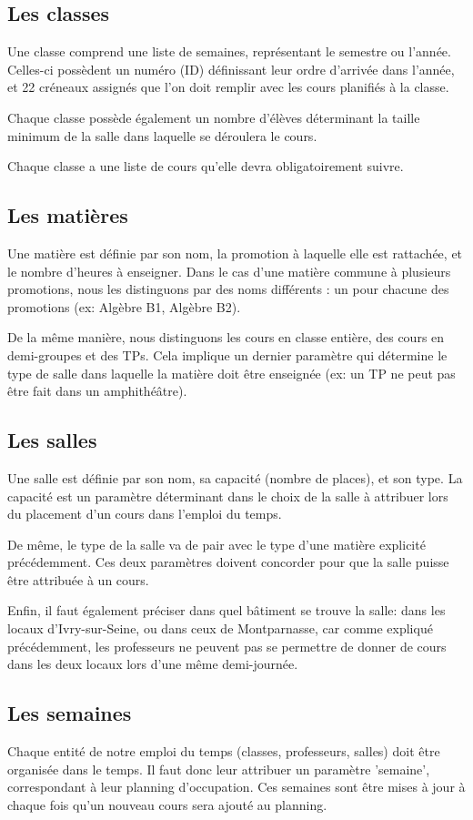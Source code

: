 \documentclass[12pt,a4paper,french]{article}
\begin{document}
\subsection{Les classes}
Une classe comprend une liste de semaines, représentant le semestre ou l'année. Celles-ci possèdent un numéro (ID) définissant leur ordre d'arrivée dans l'année, et 22 créneaux assignés que l'on doit remplir avec les cours planifiés à la classe.

Chaque classe possède également un nombre d'élèves déterminant la taille minimum de la salle dans laquelle se déroulera le cours.

Chaque classe a une liste de cours qu'elle devra obligatoirement suivre.

\subsection{Les matières}
Une matière est définie par son nom, la promotion à laquelle elle est rattachée, et le nombre d'heures à enseigner. Dans le cas d'une matière commune à plusieurs promotions, nous les distinguons par des noms différents : un pour chacune des promotions (ex: Algèbre B1, Algèbre B2).

De la même manière, nous distinguons les cours en classe entière, des cours en demi-groupes et des TPs.
Cela implique un dernier paramètre qui détermine le type de salle dans laquelle la matière doit être enseignée (ex: un TP ne peut pas être fait dans un amphithéâtre).

\subsection{Les salles}
Une salle est définie par son nom, sa capacité (nombre de places), et son type.
La capacité est un paramètre déterminant dans le choix de la salle à attribuer lors du placement d'un cours dans l'emploi du temps.

De même, le type de la salle va de pair avec le type d'une matière explicité précédemment. Ces deux paramètres doivent concorder pour que la salle puisse être attribuée à un cours.

Enfin, il faut également préciser dans quel bâtiment se trouve la salle: dans les locaux d'Ivry-sur-Seine, ou dans ceux de Montparnasse, car comme expliqué précédemment, les professeurs ne peuvent pas se permettre de donner de cours dans les deux locaux lors d'une même demi-journée.

\subsection{Les semaines}
Chaque entité de notre emploi du temps (classes, professeurs, salles) doit être organisée dans le temps. Il faut donc leur attribuer un paramètre 'semaine', correspondant à leur planning d'occupation.
Ces semaines sont être mises à jour à chaque fois qu'un nouveau cours sera ajouté au planning.
\end{document}
